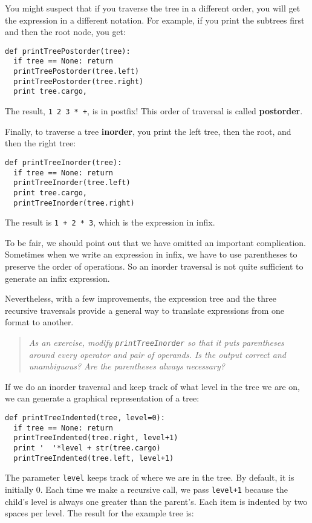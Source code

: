 You might suspect that if you traverse the tree in a
different order, you will get the expression in a different
notation.  For example, if you print the subtrees first and then
the root node, you get:

\beforeverb
\begin{verbatim}
def printTreePostorder(tree):
  if tree == None: return
  printTreePostorder(tree.left)
  printTreePostorder(tree.right)
  print tree.cargo,
\end{verbatim}
\afterverb
%
The result, {\tt 1 2 3 * +}, is in postfix!
This order of traversal is called {\bf postorder}.

Finally, to traverse a tree {\bf inorder},
you print the left tree, then the root, and then the right tree:

\beforeverb
\begin{verbatim}
def printTreeInorder(tree):
  if tree == None: return
  printTreeInorder(tree.left)
  print tree.cargo,
  printTreeInorder(tree.right)
\end{verbatim}
\afterverb
%
The result is {\tt 1 + 2 * 3}, which is the expression in infix.

To be fair, we should point out that we have omitted an
important complication.  Sometimes when we write an expression
in infix, we have to use parentheses to preserve the order of
operations.  So an inorder traversal is not quite sufficient to
generate an infix expression.

Nevertheless, with a few improvements, the expression tree and the
three recursive traversals provide a general way to translate
expressions from one format to another.

\begin{quote}
{\em As an exercise, modify {\tt printTreeInorder} so that it
puts parentheses around every operator and pair of operands.
Is the output correct and unambiguous?  Are the parentheses
always necessary? }
\end{quote}

If we do an inorder traversal and keep track of what level
in the tree we are on, we can generate a graphical representation
of a tree:

\beforeverb
\begin{verbatim}
def printTreeIndented(tree, level=0):
  if tree == None: return
  printTreeIndented(tree.right, level+1)
  print '  '*level + str(tree.cargo)
  printTreeIndented(tree.left, level+1)
\end{verbatim}
\afterverb
%
The parameter {\tt level} keeps track of where we are in the
tree.  By default, it is initially 0.  Each time we make a
recursive call, we pass {\tt level+1} because the child's level
is always one greater than the parent's.  Each item is indented by
two spaces per level.  The result for the example tree is:

